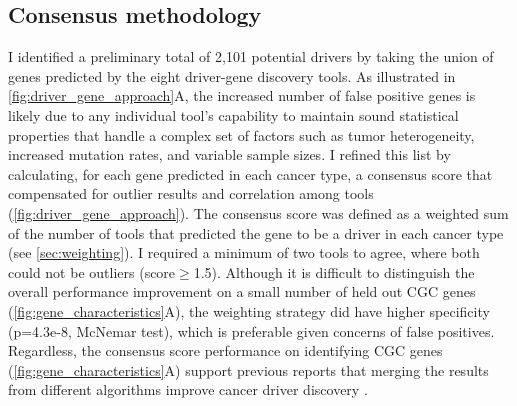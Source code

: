 \subsection{Consensus methodology}
I identified a preliminary total of 2,101 potential drivers by taking the union of genes predicted by the eight driver-gene discovery tools.  As illustrated in \autoref{fig:driver_gene_approach}A, the increased number of false positive genes is likely due to any individual tool's capability to maintain sound statistical properties that handle a complex set of factors such as tumor heterogeneity, increased mutation rates, and variable sample sizes. I refined this list by calculating, for each gene predicted in each cancer type, a consensus score that compensated for outlier results and correlation among tools (\autoref{fig:driver_gene_approach}). The consensus score was defined as a weighted sum of the number of tools that predicted the gene to be a driver in each cancer type (see \autoref{sec:weighting}). I required a minimum of two tools to agree, where both could not be outliers (score$\geq$1.5). Although it is difficult to distinguish the overall performance improvement on a small number of held out CGC genes (\autoref{fig:gene_characteristics}A), the weighting strategy did have higher specificity (p=4.3e-8, McNemar test), which is preferable given concerns of false positives. Regardless, the consensus score performance on identifying CGC genes (\autoref{fig:gene_characteristics}A) support previous reports that merging the results from different algorithms improve cancer driver discovery \cite{RN96}. 

